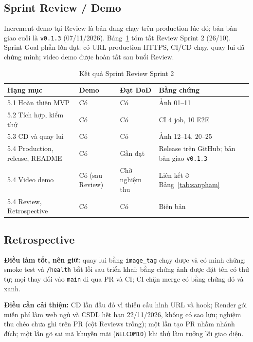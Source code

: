 \documentclass[a4paper]{article}
\begin{document}
\subsection{Sprint Review / Demo}\label{sec:se-review}
Increment demo tại Review là bản đang chạy trên production lúc đó; bản bàn giao cuối là \texttt{v0.1.3} (07/11/2026). Bảng~\ref{tab:review} tóm tắt Review Sprint 2 (26/10). Sprint Goal phần lớn đạt: có URL production HTTPS, CI/CD chạy, quay lui đã chứng minh; video demo được hoàn tất sau buổi Review.
\begin{table}[htbp]\centering
\caption{Kết quả Sprint Review Sprint 2}\label{tab:review}
\begin{tabular}{@{}p{4.4cm}p{1.8cm}p{2cm}p{4.6cm}@{}}\toprule
\textbf{Hạng mục} & \textbf{Demo} & \textbf{Đạt DoD} & \textbf{Bằng chứng} \\ \midrule
5.1 Hoàn thiện MVP & Có & Có & Ảnh 01--11 \\
5.2 Tích hợp, kiểm thử & Có & Có & CI 4 job, 10 E2E \\
5.3 CD và quay lui & Có & Có & Ảnh 12--14, 20--25 \\
5.4 Production, release, README & Có & Gần đạt & Release trên GitHub; bản bàn giao \texttt{v0.1.3} \\
5.4 Video demo & Có (sau Review) & Chờ nghiệm thu & Liên kết ở Bảng~\ref{tab:sanpham} \\
5.4 Review, Retrospective & Có & Có & Biên bản \\ \bottomrule
\end{tabular}
\end{table}

\subsection{Retrospective}\label{sec:se-retro}
\textbf{Điều làm tốt, nên giữ:} quay lui bằng \texttt{image\_tag} chạy được và có minh chứng; smoke test và \texttt{/health} bắt lỗi sau triển khai; bằng chứng ảnh được đặt tên có thứ tự; mọi thay đổi vào \texttt{main} đi qua PR và CI; CI chặn merge có bằng chứng đỏ và xanh.

\textbf{Điều cần cải thiện:} CD lần đầu đỏ vì thiếu cấu hình URL và hook; Render gói miễn phí làm web ngủ và CSDL hết hạn 22/11/2026, không có sao lưu; nghiệm thu chéo chưa ghi trên PR (cột Reviews trống); một lần tạo PR nhầm nhánh đích; một lần gõ sai mã khuyến mãi (\texttt{WELCOM10}) khi thử làm tưởng lỗi giao diện.
\end{document}
